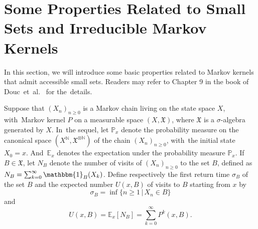 \documentclass[11pt]{elsarticle}
\def\geq{\geqslant}
\def\P{\mathbb{P}}
\def\E{\mathbb{E}}
\def\N{\mathbb{N}}
\begin{document}
\section{Some Properties Related to Small Sets and Irreducible Markov Kernels}\label{sec5-1}
In this section, we will introduce some basic properties related to Markov kernels that admit accessible small sets. Readers may refer to Chapter 9 in the book of Douc~et~al.~\cite{DMPS18} for the~details.

Suppose that $(X_n)_{n\geq0}$ is a Markov chain living on the state space $X$, with~Markov kernel $P$ on a measurable space $(X,\mathfrak{X})$, where $\mathfrak{X}$ is a $\sigma$-algebra generated by $X$. In~the sequel, let $\P_x$ denote the probability measure on the canonical space $\left(X^{\N},\mathfrak{X}^{\otimes\N}\right)$ of the chain $(X_n)_{n\geq0}$, with~the initial state $X_0=x$. And~$\E_x$ denotes the expectation under the probability measure $\P_x$. If~$B\in\mathfrak{X}$, let $N_B$ denote the number of visits of $(X_n)_{n\geq0}$ to the set $B$, defined as $N_B=\sum_{k=0}^\infty\mathbbm{1}_B(X_k)$. Define respectively the first return time $\sigma_B$ of the set $B$ and the expected number $U(x,B)$ of visits to $B$ starting from $x$ by
$$\sigma_B=\inf\{n\geq1\,|\, X_n\in B\} $$
and
$$U(x,B)=\E_x[N_B]=\sum_{k=0}^{\infty}P^k(x,B).$$
\end{document}
